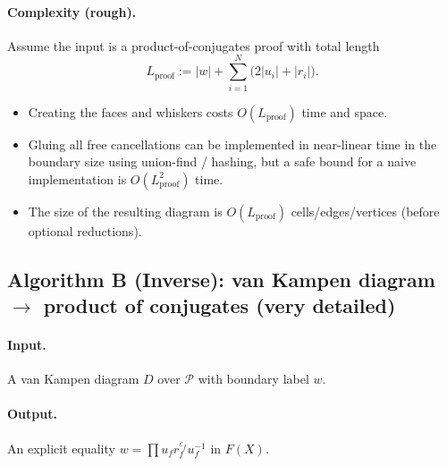 \documentclass[11pt]{article}
\theoremstyle{definition}
\theoremstyle{plain}
\theoremstyle{remark}
\begin{document}
\paragraph{Complexity (rough).}\cite{vanKampen1933,lyndonschupp1977}
Assume the input is a product-of-conjugates proof with total length
\[
L_{\mathrm{proof}} := |w| + \sum_{i=1}^N \bigl(2|u_i|+|r_i|\bigr).
\]
\begin{itemize}[leftmargin=2em]
\item Creating the faces and whiskers costs $O(L_{\mathrm{proof}})$ time and space.
\item Gluing all free cancellations can be implemented in near-linear time in the boundary size using union-find / hashing,
but a safe bound for a naive implementation is $O(L_{\mathrm{proof}}^2)$ time.
\item The size of the resulting diagram is $O(L_{\mathrm{proof}})$ cells/edges/vertices (before optional reductions).
\end{itemize}


\subsection*{Algorithm B (Inverse): van Kampen diagram $\to$ product of conjugates (very detailed)}\cite{vanKampen1933,lyndonschupp1977}
\paragraph{Input.} A van Kampen diagram $D$ over $\mathcal P$ with boundary label $w$.
\paragraph{Output.} An explicit equality $w=\prod u_f r_f^{\varepsilon_f}u_f^{-1}$ in $F(X)$.
\end{document}
